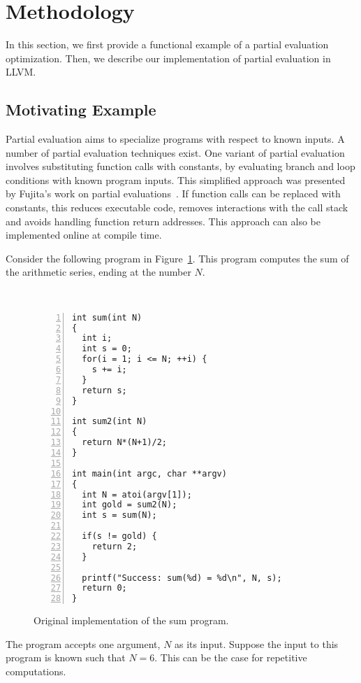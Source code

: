 \section{Methodology}
\label{sec:methodology}

In this section, we first provide a functional example of a partial evaluation optimization. Then, we describe our implementation of partial evaluation in LLVM.

\subsection{Motivating Example}
\label{sec:motivatingexample}
Partial evaluation aims to specialize programs with respect to known inputs.
A number of partial evaluation techniques exist.
One variant of partial evaluation involves substituting function calls with constants, by evaluating branch and loop conditions with known program inputs.
This simplified approach was presented by Fujita’s work on partial evaluations~\cite{Fujita}.
If function calls can be replaced with constants, this reduces executable code, removes interactions with the call stack and avoids handling function return addresses.
This approach can also be implemented online at compile time.

Consider the following program in Figure~\ref{fig:original_sum}.
This program computes the sum of the arithmetic series, ending at the number $N$.

\begin{figure}[htbp]\
\begin{Verbatim}[frame=single,fontsize={\scriptsize},numbers=left,numbersep=5pt,xleftmargin=10pt]
int sum(int N)
{
  int i;
  int s = 0;
  for(i = 1; i <= N; ++i) {
    s += i;
  }
  return s;
}

int sum2(int N)
{
  return N*(N+1)/2;
}

int main(int argc, char **argv)
{
  int N = atoi(argv[1]);
  int gold = sum2(N);
  int s = sum(N);

  if(s != gold) {
    return 2;
  }

  printf("Success: sum(%d) = %d\n", N, s);
  return 0;
}
\end{Verbatim}
\caption{Original implementation of the sum program.}
\label{fig:original_sum}
\end{figure}

The program accepts one argument, $N$ as its input.
Suppose the input to this program is known such that $N = 6$. 
This can be the case for repetitive computations. 

